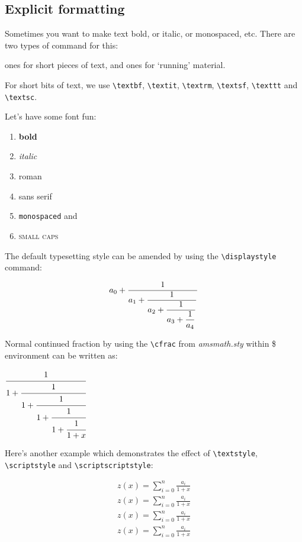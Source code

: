 \documentclass[12]{article}
\begin{document}
    \subsection{Explicit formatting}%
    \label{sub:formatting}

    Sometimes you want to make text bold, or italic, or monospaced, etc. There are two types of command for this:

    ones for short pieces of text, and ones for ‘running’ material.

    For short bits of text, we use \verb|\textbf|, \verb|\textit|, \verb|\textrm|, \verb|\textsf|, \verb|\texttt| and \verb|\textsc|.

    Let's have some font fun:

    \begin{enumerate}
        \item \textbf{bold}
        \item \textit{italic}
        \item \textrm{roman}
        \item \textsf{sans serif}
        \item \texttt{monospaced} and
        \item \textsc{small caps}
    \end{enumerate}

    The default typesetting style can be amended by using the \verb|\displaystyle| command:

    \[
    a_0+{1\over\displaystyle a_1+
          {1\over\displaystyle a_2+
            {1 \over\displaystyle a_3 +
               {1 \over\displaystyle a_4}}}}
    \]


    Normal continued fraction by using the \verb|\cfrac| from \textit{amsmath.sty} within \$ environment can be written as:

    $\cfrac{1}{1+\cfrac{1}{1+\cfrac{1}{1+\cfrac{1}{1 + \cfrac{1}{1 + x}}}}}$


    Here’s another example which demonstrates the effect of \verb|\textstyle|, \verb|\scriptstyle| and \verb|\scriptscriptstyle|:

        \begin{eqnarray*}
        z(x) = \sum_{i=0}^{n} \frac{a_i}{1+x} \\
        \textstyle z(x) = \textstyle \sum_{i=0}^{n} \frac{a_i}{1+x} \\
        \scriptstyle z(x) = \scriptstyle \sum_{i=0}^{n} \frac{a_i}{1+x} \\
        \scriptscriptstyle z(x) = \scriptscriptstyle \sum_{i=0}^{n} \frac{a_i}{1+x}
        \end{eqnarray*}
\end{document}
